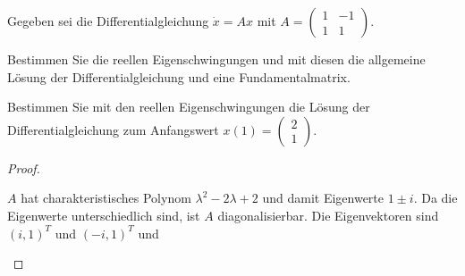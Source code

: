 \begin{Problem}
	Gegeben sei die Differentialgleichung $\dot{x} = Ax$ mit 
	$
	A = \begin{pmatrix}
		1 & -1 \\
		1 & 1
	\end{pmatrix}.
	$	
	\begin{parts}
		\item Bestimmen Sie die reellen Eigenschwingungen und mit diesen die allgemeine Lösung der Differentialgleichung und eine Fundamentalmatrix.
		\item Bestimmen Sie mit den reellen Eigenschwingungen die Lösung der Differentialgleichung zum Anfangswert 
		$
		x(1) = \begin{pmatrix}
			2 \\
			1
		\end{pmatrix}.
		$
	\end{parts}
\end{Problem}
\begin{proof}
	\begin{parts}
		\item $A$ hat charakteristisches Polynom $\lambda^2-2\lambda+2$ und damit Eigenwerte $1\pm i$. Da die Eigenwerte unterschiedlich sind, ist $A$ diagonalisierbar. Die Eigenvektoren sind $(i, 1)^T$ und $(-i, 1)^T$ und 
	\end{parts}
\end{proof}

